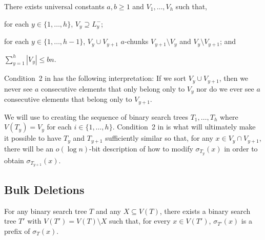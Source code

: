 \documentclass[kpfonts]{patmorin}
\begin{document}
\begin{lem}
  There exists universal constants $a,b\ge 1$ and $V_1,\ldots,V_h$ such that, 
  \begin{compactenum}
    \item for each $y\in\{1,\ldots,h\}$, $V_y\supseteq L^-_y$;
    \item for each $y\in\{1,\ldots,h-1\}$, $V_y\cup V_{y+1}$ $a$-chunks $V_{y+1}\setminus V_y$ and $V_y\setminus V_{y+1}$; and
    \item $\sum_{y=1}^h |V_y|\le bn$.
  \end{compactenum}
\end{lem}

Condition~2 in  has the following interpretation:  If we sort $V_y\cup V_{y+1}$, then we never see $a$ consecutive elements that only belong only to $V_y$ nor do we ever see $a$ consecutive elements that belong only to $V_{y+1}$.

We will use  to creating the sequence of binary search trees $T_1,\ldots,T_h$ where $V(T_y)=V_y$ for each $i\in\{1,\ldots,h\}$.  Condition~2 in  is what will ultimately make it possible to have $T_y$ and $T_{y+1}$ sufficiently similar so that, for any $x\in V_y\cap V_{y+1}$, there will be an $o(\log n)$-bit description of how to modify $\sigma_{T_y}(x)$ in order to obtain $\sigma_{T_{y+1}}(x)$.

\subsection{Bulk Deletions}

\begin{lem}
  For any binary search tree $T$ and any $X\subseteq V(T)$, there exists a binary search tree $T'$ with $V(T')=V(T)\setminus X$ such that, for every $x\in V(T')$, $\sigma_{T'}(x)$ is a prefix of $\sigma_{T}(x)$.
\end{lem}
\end{document}

